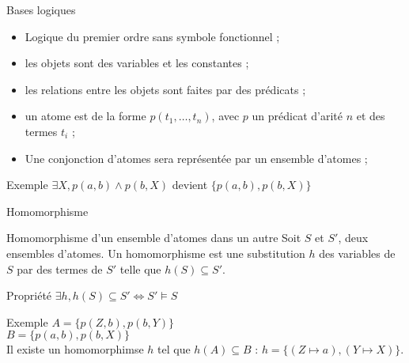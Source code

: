 
\begin{frame}{Bases logiques}
    \begin{itemize}
        \item Logique du premier ordre sans symbole fonctionnel ;
        \item les objets sont des variables et les constantes ;
        \item les relations entre les objets sont faites par des prédicats ;
        \item un atome est de la forme $p(t_1,\ldots,t_n)$, avec $p$ un prédicat d'arité $n$ et des termes $t_i$ ;
        \item Une conjonction d'atomes sera représentée par un ensemble d'atomes ;
    \end{itemize}
    
    \begin{block}{Exemple}
        $\exists X, p(a,b) \land p(b,X)$ devient $\{p(a,b),p(b,X)\}$
    \end{block}
\end{frame}

\begin{frame}{Homomorphisme}
    \begin{block}{Homomorphisme d'un ensemble d'atomes dans un autre} Soit $S$ et $S'$, deux ensembles d'atomes. Un homomorphisme est une substitution $h$ des variables de $S$ par des termes de $S'$ telle que $h(S) \subseteq S'$.
    \end{block}
    \begin{block}{Propriété}
        $\exists h, h(S) \subseteq S' \Leftrightarrow S' \vDash S$
    \end{block}
    \begin{block}{Exemple}
        $A = \{p(Z,b),p(b,Y)\}$\\
        $B = \{p(a,b),p(b,X)\}$ \\
        Il existe un homomorphimse $h$ tel que $h(A) \subseteq B$ : $h = \{(Z \mapsto a), (Y \mapsto X)\}$.
    \end{block}
\end{frame}

